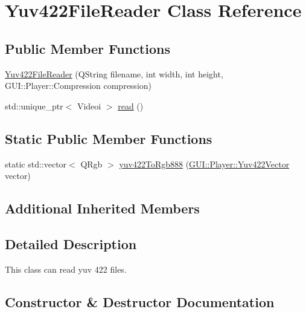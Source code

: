 \hypertarget{classGUI_1_1Player_1_1Yuv422FileReader}{}\section{Yuv422\+File\+Reader Class Reference}
\label{classGUI_1_1Player_1_1Yuv422FileReader}
\subsection*{Public Member Functions}
\begin{DoxyCompactItemize}
\item 
\hyperlink{classGUI_1_1Player_1_1Yuv422FileReader_ad7cadbaa0b0099775b54c2945a972ca2}{Yuv422\+File\+Reader} (Q\+String filename, int width, int height, G\+U\+I\+::\+Player\+::\+Compression compression)
\item 
std\+::unique\+\_\+ptr$<$ Videoi $>$ \hyperlink{classGUI_1_1Player_1_1Yuv422FileReader_a15c2e3c024093026de6ca23b53ba3a22}{read} ()
\end{DoxyCompactItemize}
\subsection*{Static Public Member Functions}
\begin{DoxyCompactItemize}
\item 
static std\+::vector$<$ Q\+Rgb $>$ \hyperlink{classGUI_1_1Player_1_1Yuv422FileReader_af2482a13511751d3f732cd82bfdb58c0}{yuv422\+To\+Rgb888} (\hyperlink{classGUI_1_1Player_1_1Yuv422Vector}{G\+U\+I\+::\+Player\+::\+Yuv422\+Vector} vector)
\end{DoxyCompactItemize}
\subsection*{Additional Inherited Members}


\subsection{Detailed Description}
This class can read yuv 422 files. 

\subsection{Constructor \& Destructor Documentation}
\hypertarget{classGUI_1_1Player_1_1Yuv422FileReader_ad7cadbaa0b0099775b54c2945a972ca2}{}
